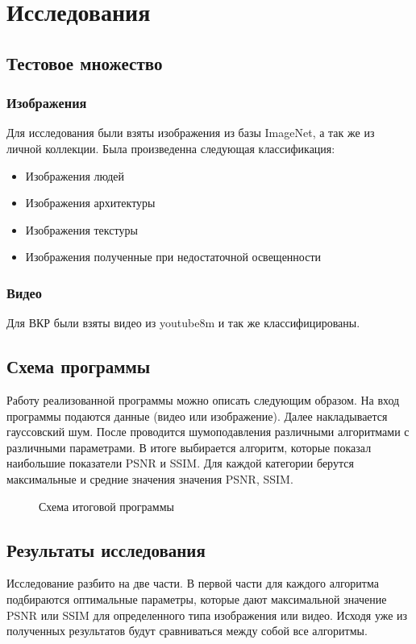 \section{Исследования}
\subsection{Тестовое множество}
\subsubsection{Изображения}
Для исследования были взяты изображения из базы ImageNet, а так же из личной коллекции. Была произведенна следующая классификация:
\begin{itemize}
	\item Изображения людей
	\item Изображения архитектуры
	\item Изображения текстуры
	\item Изображения полученные при недостаточной освещенности
\end{itemize}
\subsubsection{Видео}
Для ВКР были взяты видео из youtube8m и так же классифицированы.

\subsection{Схема программы}
Работу реализованной программы можно описать следующим образом. На вход программы подаются данные (видео или изображение). Далее накладывается гауссовский шум. После проводится шумоподавления различными алгоритмами с различными параметрами. В итоге выбирается алгоритм, которые показал наибольшие показатели PSNR и SSIM. Для каждой категории берутся максимальные и средние значения значения PSNR, SSIM.
\begin{figure}[H]
	\caption{Схема итоговой программы}
\end{figure}
\subsection{Результаты исследования}
Исследование разбито на две части. В первой части для каждого алгоритма подбираются оптимальные параметры, которые дают максимальной значение PSNR или SSIM для определенного типа изображения или видео. Исходя уже из полученных результатов будут сравниваться между собой все алгоритмы.

